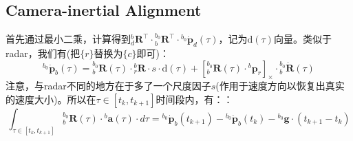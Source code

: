 \documentclass[12pt, onecolumn]{article}
\newcommand\liehat[1]{\left[ #1 \right]_\times}
\newcommand\bsm[1]{\boldsymbol{\mathrm{#1}}}
\begin{document}
	\subsection{Camera-inertial Alignment}
	首先通过最小二乘，计算得到${^{b}_{d}\boldsymbol{R}^\top}\cdot{^{b_0}_{b}\boldsymbol{R}^\top}\cdot{^{b_0}\dot{\boldsymbol{p}}_d(\tau)}$，记为$\bsm{d}(\tau)$向量。类似于radar，我们有(把$\{r\}$替换为$\{c\}$即可)：
	\begin{equation}
	{^{b_0}\dot{\boldsymbol{p}}_b(\tau)}={^{b_0}_{b}\boldsymbol{R}}(\tau)\cdot{^{b}_{r}\boldsymbol{R}}\cdot s\cdot\bsm{d}(\tau)
	+\liehat{{^{b_0}_{b}\boldsymbol{R}(\tau)}\cdot{^{b}{\boldsymbol{p}}_r}}\cdot{^{b_0}_{b}\dot{\boldsymbol{R}}(\tau)}
	\end{equation}
	注意，与radar不同的地方在于多了一个尺度因子$s$(作用于速度方向以恢复出真实的速度大小)。所以在$\tau\in[t_k,t_{k+1}]$时间段内，有：：
	\begin{equation}
	\int_{\tau\in[t_k,t_{k+1}]}{^{b_0}_{b}\boldsymbol{R}(\tau)}\cdot{^{b}\boldsymbol{a}(\tau)}\cdot d\tau=
	{^{b_0}\dot{\boldsymbol{p}}_b(t_{k+1})}-{^{b_0}\dot{\boldsymbol{p}}_b(t_k)}
	-{^{b_0}\boldsymbol{g}}\cdot (t_{k+1}-t_k)
	\end{equation}
	
\end{document}
